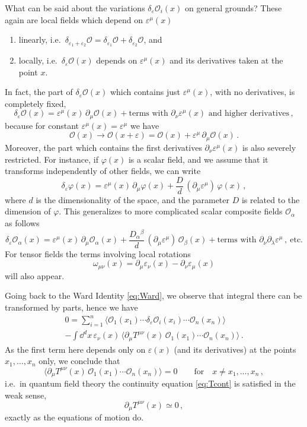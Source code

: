 What can be said about the variations $\delta_\varepsilon\mathcal O_i(x)$ on
general grounds? These again are local fields which depend on $\varepsilon^\mu(x)$
\begin{enumerate}[label=(\roman*)]
\item linearly, i.e.\
$\delta_{\varepsilon_1+\varepsilon_2}\mathcal O=\delta_{\varepsilon_1}\mathcal O+\delta_{\varepsilon_2}\mathcal O$,
and
\item locally, i.e.\ $\delta_\varepsilon\mathcal O(x)$ depends on
$\varepsilon^\mu(x)$ and its derivatives taken at the point $x$.
\end{enumerate}
In fact, the part of $\delta_\varepsilon\mathcal O(x)$ which contains just
$\varepsilon^\mu(x)$, with no derivatives, is completely fixed,
\[
\delta_\varepsilon\mathcal O(x)=\varepsilon^\mu(x)\,\partial_\mu\mathcal O(x)+\text{terms with }\partial_\nu\varepsilon^\mu(x)\text{ and higher derivatives}\,,
\]
because for constant $\varepsilon^\mu(x)=\varepsilon^\mu$ we have
\[
\mathcal O(x)\to\mathcal O(x+\varepsilon)=\mathcal O(x)+\varepsilon^\mu\,\partial_\mu\mathcal O(x)\,.
\]
Moreover, the part which contains the first derivatives $\partial_\nu\varepsilon^\mu(x)$
is also severely restricted. For instance, if $\varphi(x)$ is a scalar field, and we
assume that it transforms independently of other fields, we can write
\[
\delta_\varepsilon\varphi(x)=\varepsilon^\mu(x)\,\partial_\mu\varphi(x)+\frac Dd\,(\partial_\mu\varepsilon^\mu)\,\varphi(x)\,,
\]
where $d$ is the dimensionality of the space, and the parameter $D$ is related to
the dimension of $\varphi$. This generalizes to more complicated scalar composite
fields $\mathcal O_\alpha$ as follows
\[
\delta_\varepsilon\mathcal O_\alpha(x)=\varepsilon^\mu(x)\,\partial_\mu\mathcal O_\alpha(x)+\frac{D_\alpha{}^\beta}d\,(\partial_\mu\varepsilon^\mu)\,\mathcal O_\beta(x)+\text{terms with }\partial_\nu\partial_\lambda\varepsilon^\mu\,,\ \text{etc.}
\]
For tensor fields the terms involving local rotations
\[
\omega_{\mu\nu}(x)=\partial_\mu\varepsilon_\nu(x)-\partial_\nu\varepsilon_\mu(x)
\]
will also appear.

Going back to the Ward Identity \eqref{eq:Ward}, we observe that integral there can
be transformed by parts, hence we have
\begin{multline}\label{eq:Ward2}
0=\sum_{i=1}^n\bigl\langle\mathcal O_1(x_1)\cdots\delta_\varepsilon\mathcal O_i(x_i)\cdots\mathcal O_n(x_n)\bigr\rangle\\
-\int \dd^dx\,\varepsilon_\nu(x)\,\bigl\langle\partial_\mu T^{\mu\nu}(x)\,\mathcal O_1(x_1)\cdots\mathcal O_n(x_n)\bigr\rangle\,.
\end{multline}
As the first term here depends only on $\varepsilon(x)$ (and its derivatives) at the
points $x_1,\dots,x_n$ only, we conclude that
\[
\bigl\langle\partial_\mu T^{\mu\nu}(x)\,\mathcal O_1(x_1)\cdots\mathcal O_n(x_n)\bigr\rangle=0\qquad\text{for}\quad x\neq x_1,\dots,x_n\,,
\]
i.e.\ in quantum field theory the continuity equation \eqref{eq:Tcont} is satisfied
in the weak sense,
\[
\partial_\mu T^{\mu\nu}(x)\simeq0\,,
\]
exactly as the equations of motion do.

